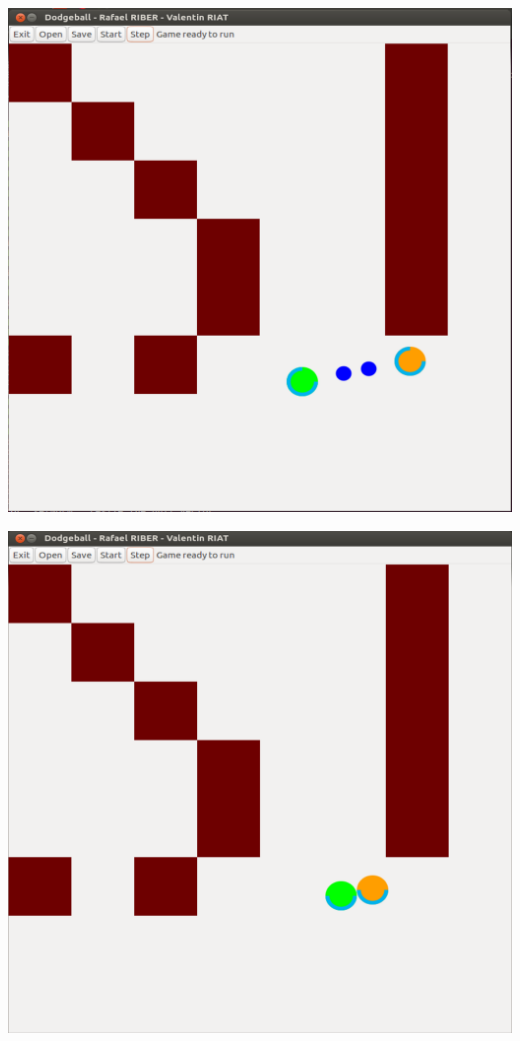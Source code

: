 \documentclass[a4paper, 11pt]{article}
\begin{document}
\begin{minipage}{0.33333333\textwidth}
\includegraphics[width=\textwidth]{figures/sim8.PNG}
\end{minipage}
\begin{minipage}{0.33333333\textwidth}
\includegraphics[width=\textwidth]{figures/sim9.PNG}
\end{minipage}
\end{document}
